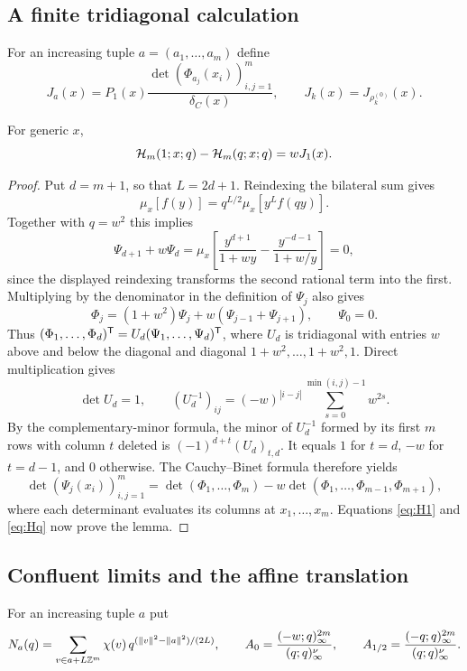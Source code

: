 \subsection{A finite tridiagonal calculation}
For an increasing tuple $a=(a_1,\dots,a_m)$ define
\[
J_a(x)=P_1(x)\frac{\det(\Phi_{a_j}(x_i))_{i,j=1}^m}{\delta_C(x)},\qquad J_k(x)=J_{\rho^{(0)}_k}(x).
\]

\begin{lemma}\label{lem:tridiag}
For generic $x$,
\begin{equation}\label{eq:tridiag}
\mathcal{H}_m(1;x;q)-\mathcal{H}_m(q;x;q)=wJ_1(x).
\end{equation}
\end{lemma}

\begin{proof}
Put $d=m+1$, so that $L=2d+1$. Reindexing the bilateral sum gives
\[
\mu_x[f(y)]=q^{L/2}\mu_x[y^Lf(qy)].
\]
Together with $q=w^2$ this implies
\[
\Psi_{d+1}+w\Psi_d=\mu_x\left[\frac{y^{d+1}}{1+wy}-\frac{y^{-d-1}}{1+w/y}\right]=0,
\]
since the displayed reindexing transforms the second rational term into the first. Multiplying by the denominator in the definition of $\Psi_j$ also gives
\[
\Phi_j=(1+w^2)\Psi_j+w(\Psi_{j-1}+\Psi_{j+1}),\qquad \Psi_0=0.
\]
Thus $(\Phi_1,\dots,\Phi_d)^{\mathsf{T}}=U_d(\Psi_1,\dots,\Psi_d)^{\mathsf{T}}$, where $U_d$ is tridiagonal with entries $w$ above and below the diagonal and diagonal $1+w^2,\dots,1+w^2,1$. Direct multiplication gives
\[
\det U_d=1,\qquad (U_d^{-1})_{ij}=(-w)^{|i-j|}\sum_{s=0}^{\min(i,j)-1}w^{2s}.
\]
By the complementary-minor formula, the minor of $U_d^{-1}$ formed by its first $m$ rows with column $t$ deleted is $(-1)^{d+t}(U_d)_{t,d}$. It equals $1$ for $t=d$, $-w$ for $t=d-1$, and $0$ otherwise. The Cauchy--Binet formula therefore yields
\[
\det(\Psi_j(x_i))_{i,j=1}^m=\det(\Phi_1,\dots,\Phi_m)-w\det(\Phi_1,\dots,\Phi_{m-1},\Phi_{m+1}),
\]
where each determinant evaluates its columns at $x_1,\dots,x_m$. Equations \eqref{eq:H1} and \eqref{eq:Hq} now prove the lemma.
\end{proof}

\subsection{Confluent limits and the affine translation}
For an increasing tuple $a$ put
\[
N_a(q)=\sum_{v\in a+L\mathbb{Z}^m}\chi(v)\,q^{(\|v\|^2-\|a\|^2)/(2L)},\qquad A_0=\frac{(-w;q)_\infty^{2m}}{(q;q)_\infty^\nu},\qquad A_{1/2}=\frac{(-q;q)_\infty^{2m}}{(q;q)_\infty^\nu}.
\]

